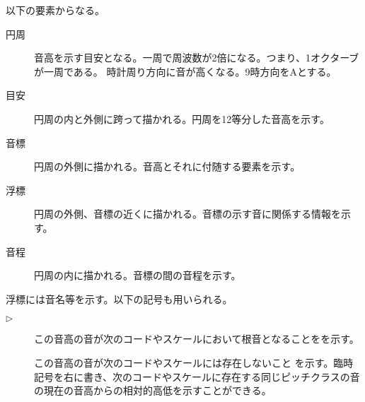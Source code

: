 \documentclass[b5]{ltjsbook}
\newcommand{\ket}[1]{\left|#1\right\rangle}
\begin{document}
以下の要素からなる。
\begin{description}
\item[円周] 音高を示す目安となる。一周で周波数が2倍になる。つまり、1オクターブが一周である。
  時計周り方向に音が高くなる。9時方向をAとする。
\item[目安] 円周の内と外側に跨って描かれる。円周を12等分した音高を示す。
\item[音標] 円周の外側に描かれる。音高とそれに付随する要素を示す。
\item[浮標] 円周の外側、音標の近くに描かれる。音標の示す音に関係する情報を示す。
\item[音程] 円周の内に描かれる。音標の間の音程を示す。
\end{description}

浮標には音名等を示す。以下の記号も用いられる。

\begin{description}
\item[$\rhd$] この音高の音が次のコードやスケールにおいて根音となることをを示す。
\item[] この音高の音が次のコードやスケールには存在しないこと
  を示す。臨時記号を右に書き、次のコードやスケールに存在する同じピッチクラスの音
  の現在の音高からの相対的高低を示すことができる。
\end{description}


\end{document}
